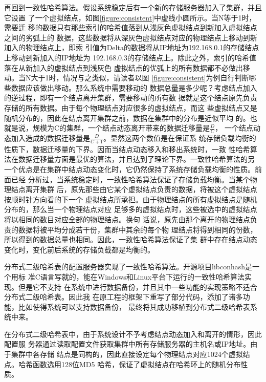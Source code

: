 再回到一致性哈希算法。假设系统稳定后有一个新的存储服务器加入了集群，并且它设置
了一个虚拟结点，如图\ref{figure:consistent}中虚线小圆所示。当N等于1时，需要迁
移的数据只有那些索引的哈希值落到从浅灰色虚拟结点到新加入虚拟结点之间的劣弧上的
数据，这些数据将从深灰色虚拟结点对应的物理结点上移动到新加入的物理结点上，即索
引值为Delta的数据将从IP地址为192.168.0.1的存储结点上移动到新加入的IP地址为
192.168.0.3的存储结点上。除此之外，索引的哈希值落在从新加入的虚拟结点到浅灰色
虚拟结点的优弧上的所有数据都不必做出移动。当N大于1时，情况与之类似，请读者以图
\ref{figure:consistent}为例自行判断哪些数据应该做出移动。那么系统中需要移动的
数据总量是多少呢？考虑结点加入的逆过程，即有一个结点离开集群，需要移动的所有数
据就是这个结点原先负责存储的所有数据。由于每个物理结点对应很多的虚拟结点，而这
些虚拟结点又是随机分布的，因此在结点离开集群之前，数据在集群中的分布是近似平均
的。也就是说，规模为C的集群，一个结点动态离开带来的数据迁移量是$\frac{D}{C}$，
一个结点动态加入造成的数据迁移量是$\frac{D}{C + 1}$。显然这两个数值是在保证系
统存储负载均衡的性质下，数据迁移量的下界。因而当结点动态移入和移出系统时，一致
性哈希算法在数据迁移量方面是最优的算法，并且达到了理论下界。一致性哈希算法的另
一个优点是在集群中结点动态变化时，它仍然保持了系统存储负载均衡的性质。前面已经
分析过，当系统稳定时，一致性哈希算法保证了存储负载均衡。当某个物理结点离开集群
后，原先那些由它某个虚拟结点负责的数据，将被这个虚拟结点按顺时针方向看的下一个
虚拟结点所承担。由于物理结点的所有虚拟结点是随机分布的，那么当一个物理结点对应
足够多的虚拟结点时，这些被选中的虚拟结点将以相同的数目对应全部的物理结点。换句
话说，原先由那个离开的物理结点负责的数据将被平均分成若干份，集群中其余的每个物
理结点将得到相同的份数，所以得到的数据总量也相同。因此，一致性哈希算法保证了集
群中存在结点动态变化时，变化前后系统的存储负载都是均衡的。

分布式二级哈希表的配置服务器实现了一致性哈希算法。开源项目libconhash是一个用标
准C语言写就的，能在Windows和Linux平台下运行的一致性哈希算法实现。但是它不支持
在系统中进行数据备份，并且其中一些功能的实现策略不适合分布式二级哈希表。因此我
在原工程的框架下重写了部分代码，添加了诸多功能，比如使得系统可以支持数据备份，
最终将其成功移植到分布式二级哈希表系统中来。

在分布式二级哈希表中，由于系统设计不予考虑结点动态加入和离开的情形，因此配置服
务器通过读取配置文件获取集群中所有存储服务器的主机名或IP地址。由于集群中各存储
结点是同构的，因此直接设定每个物理结点对应1024个虚拟结点。哈希函数选用128位MD5
哈希\cite{rivest1992rfc1321}，保证了虚拟结点在哈希环上的随机分布性质。

